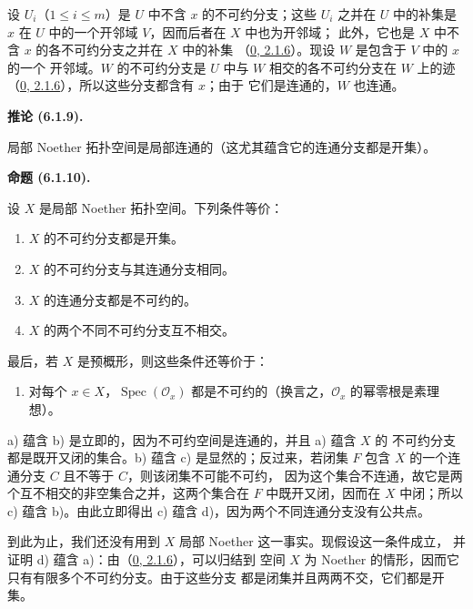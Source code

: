 \documentclass[UTF8,fontset=none,11pt,oneside,openany]{ctexbook}
\newenvironment{proposition}[1][]{%
  \par\medskip\noindent\textbf{命题 (#1).}\ %
}{\par}
\newenvironment{corollary}[1][]{%
  \par\medskip\noindent\textbf{推论 (#1).}\ %
}{\par}
\newcommand{\oldpage}[2][]{%
  \hypertarget{ega-source-page-#1-#2}{}%
  \marginnote{\scriptsize\textbf{#1}~|~#2}\ignorespaces}
\let\EGAOriginalLabel\label
\renewcommand{\label}[1]{\phantomsection\EGAOriginalLabel{#1}}
\begin{document}
设 $U_i$（$1\leq i\leq m$）是 $U$ 中不含 $x$ 的不可约分支；这些
$U_i$ 之并在 $U$ 中的补集是 $x$ 在 $U$ 中的一个开邻域 $V$，因而后者在
$X$ 中也为开邻域；
此外，它也是 $X$ 中不含 $x$ 的各不可约分支之并在 $X$ 中的补集
（\hyperref[0.2.1.6-fr]{0, 2.1.6}）。现设 $W$ 是包含于 $V$ 中的 $x$ 的一个
开邻域。$W$ 的不可约分支是 $U$ 中与 $W$ 相交的各不可约分支在 $W$
上的迹（\hyperref[0.2.1.6-fr]{0, 2.1.6}），所以这些分支都含有 $x$；由于
它们是连通的，$W$ 也连通。

\begin{corollary}[6.1.9]
\label{I.6.1.9-fr}
局部 Noether 拓扑空间是局部连通的（这尤其蕴含它的连通分支都是开集）。
\end{corollary}

\begin{proposition}[6.1.10]
\label{I.6.1.10-fr}
设 $X$ 是局部 Noether 拓扑空间。下列条件等价：
\begin{enumerate}
  \item[a)] $X$ 的不可约分支都是开集。
  \item[b)] $X$ 的不可约分支与其连通分支相同。
  \item[c)] $X$ 的连通分支都是不可约的。
  \item[d)] $X$ 的两个不同不可约分支互不相交。
\end{enumerate}

最后，若 $X$ 是预概形，则这些条件还等价于：
\begin{enumerate}
  \item[e)] 对每个 $x\in X$，$\operatorname{Spec}(\mathscr{O}_x)$
    都是不可约的（换言之，$\mathscr{O}_x$ 的幂零根是素理想）。
\end{enumerate}
\end{proposition}

a) 蕴含 b) 是立即的，因为不可约空间是连通的，并且 a) 蕴含 $X$ 的
不可约分支都是既开又闭的集合。b) 蕴含 c) 是显然的；反过来，若闭集
$F$ 包含
\oldpage[I]{143}
$X$ 的一个连通分支 $C$ 且不等于 $C$，则该闭集不可能不可约，
因为这个集合不连通，故它是两个互不相交的非空集合之并，这两个集合在
$F$ 中既开又闭，因而在 $X$ 中闭；所以 c) 蕴含 b)。由此立即得出 c)
蕴含 d)，因为两个不同连通分支没有公共点。

到此为止，我们还没有用到 $X$ 局部 Noether 这一事实。现假设这一条件成立，
并证明 d) 蕴含 a)：由（\hyperref[0.2.1.6-fr]{0, 2.1.6}），可以归结到
空间 $X$ 为 Noether 的情形，因而它只有有限多个不可约分支。由于这些分支
都是闭集并且两两不交，它们都是开集。
\end{document}
